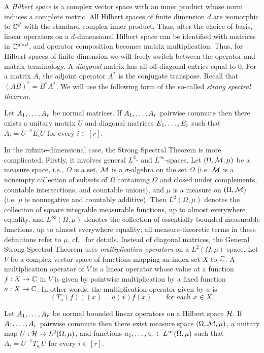 A \emph{Hilbert space} is a complex vector space with an inner product whose
norm induces a complete metric.
All Hilbert spaces of finite dimension $d$ are
isomorphic to ${\mathbb C}^d$ with the standard complex inner product. Thus, 
after the choice of basis, linear operators on a $d$-dimensional Hilbert space
can be identified with matrices in ${\mathbb C}^{d\times d}$, and operator composition
becomes matrix multiplication. 
%
Thus, for Hilbert spaces of finite dimension we will
freely switch between the operator and matrix terminology.
%
A \emph{diagonal} matrix has all off-diagonal
entries equal to $0$. 
For a matrix $A$, the adjoint operator $A^*$ is the conjugate transpose.
%
Recall that $(AB)^*=B^*A^*$.
%
We will use the following form of the so-called \emph{strong spectral
theorem}.
%
\begin{theorem}
\label{the:SST}
Let $A _1,\ldots, A _{r}$ be normal matrices. If $A _1,\ldots, A _{r}$ pairwise
commute then there exists a unitary matrix $U$ and diagonal matrices 
$E _1,\ldots, E _{r}$ such that $A_i=U^{-1}E_iU$ for every $i\in[r]$.
\end{theorem}

In the infinite-dimensional case, the Strong Spectral Theorem is more
complicated. Firstly, it involves general $L^2$- and $L^\infty$-spaces. Let
$(\Omega,{\mathcal M},\mu)$ be a measure space, i.e., $\Omega$ is a set, ${\mathcal M}$ is a
$\sigma$-algebra on the set $\Omega$ (i.e. ${\mathcal M}$ is a nonempty collection of
subsets of $\Omega$ containing $\Omega$ and closed under complements, countable intersections, and
countable unions), and $\mu$ is a measure on $(\Omega,{\mathcal M})$ (i.e. $\mu$ is
nonnegative and countably additive). Then $L^2(\Omega,\mu)$ denotes
the collection of square integrable measurable functions, up to almost
everywhere equality, and $L^\infty(\Omega,\mu)$ denotes the
collection of essentially bounded measurable functions, up to almost everywhere equality; all measure-theoretic terms in
these definitions refer to $\mu$, cf.~\cite{Folland94} for details. Instead of diagonal matrices, the General Strong Spectral Theorem uses \emph{multiplication operators} on a $L^2(\Omega,\mu)$-space. Let $V$ be a complex vector space of functions mapping an index set $X$ to ${\mathbb C}$. A multiplication operator of $V$ is a linear operator whose value at a function $f:X\to{\mathbb C}$ in $V$ is given by pointwise multiplication by a fixed function $a:X\to{\mathbb C}$. In other words, the multiplication operator given by $a$ is
\[
(T_a(f))(x)=a(x)f(x)\qquad\text{for each $x\in X$}.
\]

\begin{theorem}\label{the:general-sst}
Let $A _1,\ldots, A _{r}$ be normal bounded linear operators on a Hilbert space ${\mathcal H}$. If $A _1,\ldots, A _{r}$ pairwise commute then there exist measure space $(\Omega,{\mathcal M},\mu)$, a unitary map $U:{\mathcal H}\to L^2(\Omega,\mu)$, and functions $a _1,\ldots, a _{r}\in L^\infty(\Omega,\mu)$ such that $A_i=U^{-1}T_{a_i}U$ for every $i\in[r]$.
\end{theorem}

